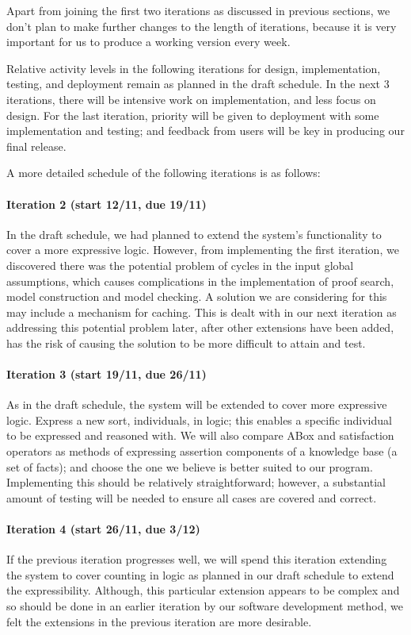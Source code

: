 Apart from joining the first two iterations as discussed in previous sections, we don't plan to make further changes to the length of iterations, because it is very important for us to produce a working version every week.

Relative activity levels in the following iterations for design, implementation, testing, and deployment remain as planned in the draft schedule. In the next 3 iterations, there will be intensive work on implementation, and less focus on design. For the last iteration, priority will be given to deployment with some implementation and testing; and  feedback from users will be key in producing our final release.

A more detailed schedule of the following iterations is as follows:
\paragraph{Iteration 2 (start 12/11, due 19/11)} In the draft schedule, we had planned to extend the system's functionality to cover a more expressive logic. However, from implementing the first iteration, we discovered there was the potential problem of cycles in the input global assumptions, which causes complications in the implementation of proof search, model construction and model checking. A solution we are considering for this may include a mechanism for caching. This is dealt with in our next iteration as addressing this potential problem later, after other extensions have been added, has the risk of causing the solution to be more difficult to attain and test.
\paragraph{Iteration 3 (start 19/11, due 26/11)} As in the draft schedule, the system will be extended to cover more expressive logic. Express a new sort, individuals, in logic; this enables a specific individual to be expressed and reasoned with. We will also compare ABox and satisfaction operators as methods of expressing assertion components of a knowledge base (a set of facts); and choose the one we believe is better suited to our program. Implementing this should be relatively straightforward; however, a substantial amount of testing will be needed to ensure all cases are covered and correct.
\paragraph{Iteration 4 (start 26/11, due 3/12)} If the previous iteration progresses well, we will spend this iteration extending the system to cover counting in logic as planned in our draft schedule to extend the expressibility. Although, this particular extension appears to be complex and so should be done in an earlier iteration by our software development method, we felt the extensions in the previous iteration are more desirable.
